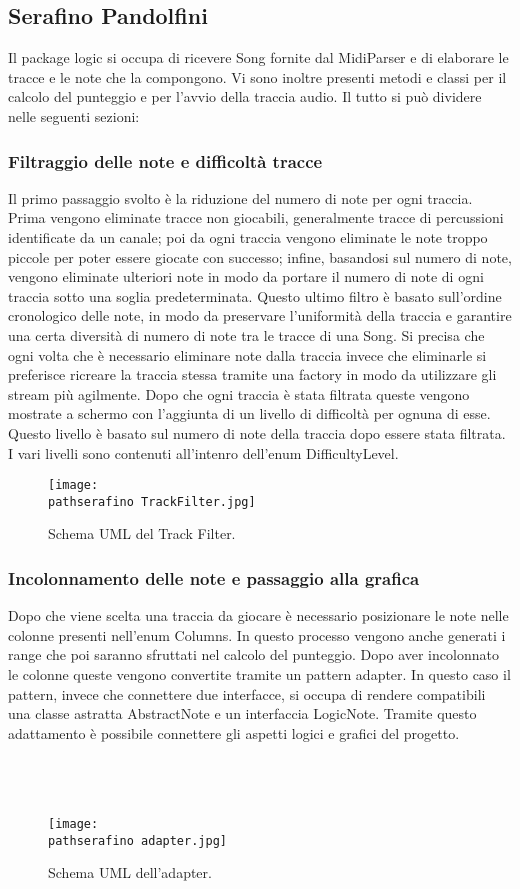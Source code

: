 \documentclass[a4paper,12pt]{report}
\newcommand\pathserafino{img/serafino/}
\begin{document}
\subsection{Serafino Pandolfini}
Il package logic si occupa di ricevere Song fornite dal MidiParser e di elaborare le tracce e le note che la compongono. Vi sono inoltre presenti metodi e classi per il calcolo del punteggio e per l'avvio della traccia audio. Il tutto si può dividere nelle seguenti sezioni:
\subsubsection{Filtraggio delle note e difficoltà tracce}
Il primo passaggio svolto è la riduzione del numero di note per ogni traccia. Prima vengono eliminate tracce non giocabili, generalmente tracce di percussioni identificate da un canale; poi da ogni traccia vengono eliminate le note troppo piccole per poter essere giocate con successo; infine, basandosi sul numero di note, vengono eliminate ulteriori note in modo da portare il numero di note di ogni traccia sotto una soglia predeterminata. Questo ultimo filtro è basato sull'ordine cronologico delle note, in modo da preservare l'uniformità della traccia e garantire una certa diversità di numero di note tra le tracce di una Song. Si precisa che ogni volta che è necessario eliminare note dalla traccia invece che eliminarle si preferisce ricreare la traccia stessa tramite una factory in modo da utilizzare gli stream più agilmente.
Dopo che ogni traccia è stata filtrata queste vengono mostrate a schermo con l'aggiunta di un livello di difficoltà per ognuna di esse. Questo livello è basato sul numero di note della traccia dopo essere stata filtrata. I vari livelli sono contenuti all'intenro dell'enum DifficultyLevel.
\begin{figure}[!htb]
	\centerline{\texttt{[image: \\pathserafino TrackFilter.jpg]}}
	\caption{Schema UML del Track Filter.}
	\label{img:trackfilter}
\end{figure}
\clearpage \hfill\break
\subsubsection{Incolonnamento delle note e passaggio alla grafica}
Dopo che viene scelta una traccia da giocare è necessario posizionare le note nelle colonne presenti nell'enum Columns. In questo processo vengono anche generati i range che poi saranno sfruttati nel calcolo del punteggio. Dopo aver incolonnato le colonne queste vengono convertite tramite un pattern adapter. In questo caso il pattern, invece che connettere due interfacce, si occupa di rendere compatibili una classe astratta AbstractNote e un interfaccia LogicNote. Tramite questo adattamento è possibile connettere gli aspetti logici e grafici del progetto. \\ \\ \\ \\
\begin{figure}[!htb]
	\centerline{\texttt{[image: \\pathserafino adapter.jpg]}}
	\caption{Schema UML dell'adapter.}
	\label{img:incollamentonote}
\end{figure}
\clearpage \hfill\break
\end{document}
